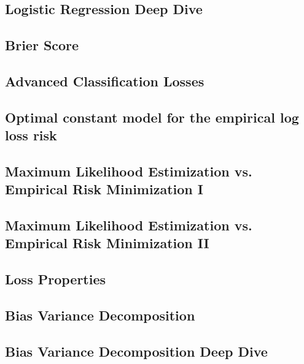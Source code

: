 \subsection{Logistic Regression Deep Dive}


\subsection{Brier Score}


\subsection{Advanced Classification Losses}


\subsection{Optimal constant model for the empirical log loss risk}


\subsection{Maximum Likelihood Estimization vs. Empirical Risk Minimization I}


\subsection{Maximum Likelihood Estimization vs. Empirical Risk Minimization II}


\subsection{Loss Properties}


\subsection{Bias Variance Decomposition}


\subsection{Bias Variance Decomposition Deep Dive}

